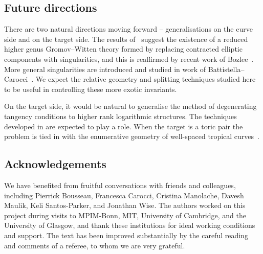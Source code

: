 \documentclass[11pt]{amsart}
\theoremstyle{definition}
\theoremstyle{definition}
\begin{document}
\subsection{Future directions} There are two natural directions moving forward -- generalisations on the curve side and on the target side. The results of~\cite{RSPW} suggest the existence of a reduced higher genus Gromov--Witten theory formed by replacing contracted elliptic components with singularities, and this is reaffirmed by recent work of Bozlee~\cite{Boz19}. More general singularities are introduced and studied in work of Battistella--Carocci~\cite{BC20}. We expect the relative geometry and splitting techniques studied here to be useful in controlling these more exotic invariants.%


On the target side, it would be natural to generalise the method of degenerating tangency conditions to higher rank logarithmic structures. The techniques developed in \cite{MaximalContacts} are expected to play a role. When the target is a toric pair the problem is tied in with the enumerative geometry of well-spaced tropical curves~\cite{LR18,RSPW2,Speyer}. %

\subsection*{Acknowledgements} We have benefited from fruitful conversations with friends and colleagues, including Pierrick Bousseau, Francesca Carocci, Cristina Manolache, Davesh Maulik, Keli Santos-Parker, and Jonathan Wise. The authors worked on this project during visits to MPIM-Bonn, MIT, University of Cambridge, and the University of Glasgow, and thank these institutions for ideal working conditions and support. The text has been improved substantially by the careful reading and comments of a referee, to whom we are very grateful. 
\end{document}
